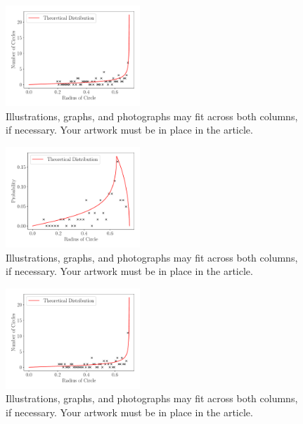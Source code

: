 \documentclass[journal]{IEEEtran}
\begin{document}
\begin{figure}[H]%
\begin{center}
\includegraphics[width=0.45\textwidth]{./../Figures/750_07.pdf}
\caption{Illustrations, graphs, and photographs may fit across both columns, if
  necessary. Your artwork must be in place in the article.}
\label{fig:size7}
\end{center}
\end{figure}

\begin{figure}[H]%
\begin{center}
\includegraphics[width=0.45\textwidth]{./../Figures/750_07_random.pdf}
\caption{Illustrations, graphs, and photographs may fit across both columns, if
  necessary. Your artwork must be in place in the article.}
\label{fig:random}
\end{center}
\end{figure}

\begin{figure}[H]%
\begin{center}
\includegraphics[width=0.45\textwidth]{./../Figures/750_07_NoNoise.pdf}
\caption{Illustrations, graphs, and photographs may fit across both columns, if
  necessary. Your artwork must be in place in the article.}
\label{fig:nonoise}
\end{center}
\end{figure}
\end{document}
